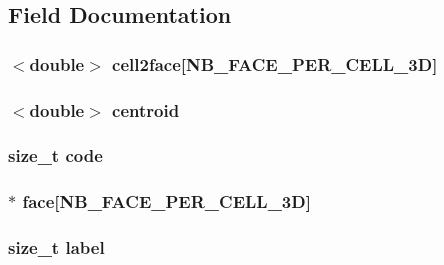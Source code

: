 \subsection{Field Documentation}
\hypertarget{classFVCell3D_a13f89e3dcdbe5547a6ef0b92f3bb4583}{
\subsubsection[{cell2face}]{$<$double$>$ {\bf cell2face}\mbox{[}NB\_\-FACE\_\-PER\_\-CELL\_\-3D\mbox{]}}}
\label{d0/ded/classFVCell3D_a13f89e3dcdbe5547a6ef0b92f3bb4583}
\hypertarget{classFVCell3D_af0e77c00d990c1a712cf032be1bb8f0f}{
\subsubsection[{centroid}]{$<$double$>$ {\bf centroid}}}
\label{d0/ded/classFVCell3D_af0e77c00d990c1a712cf032be1bb8f0f}
\hypertarget{classFVCell3D_acf258c3b3328a96e3ee1e3b875b7874f}{
\subsubsection[{code}]{\setlength{\rightskip}{0pt plus 5cm}size\_\-t {\bf code}}}
\label{d0/ded/classFVCell3D_acf258c3b3328a96e3ee1e3b875b7874f}
\hypertarget{classFVCell3D_a1e22889f938f60a77af81fe2dd8423f9}{
\subsubsection[{face}]{$\ast$ {\bf face}\mbox{[}NB\_\-FACE\_\-PER\_\-CELL\_\-3D\mbox{]}}}
\label{d0/ded/classFVCell3D_a1e22889f938f60a77af81fe2dd8423f9}
\hypertarget{classFVCell3D_a1ec973463c76e6d9e91160720959ad68}{
\subsubsection[{label}]{\setlength{\rightskip}{0pt plus 5cm}size\_\-t {\bf label}}}
\label{d0/ded/classFVCell3D_a1ec973463c76e6d9e91160720959ad68}
